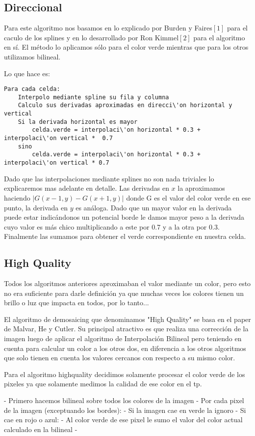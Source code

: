 \subsection{Direccional}

Para este algoritmo nos basamos en lo explicado por Burden y Faires$[1]$ para el caculo de los splines y en lo desarrollado por Ron Kimmel$[2]$ para el algoritmo en sí. El método lo aplicamos sólo para el color verde mientras que para los otros utilizamos bilineal. 

Lo que hace es:
\begin{lstlisting}[frame=single] 
Para cada celda:
	Interpolo mediante spline su fila y columna
	Calculo sus derivadas aproximadas en direcci\'on horizontal y vertical
	Si la derivada horizontal es mayor
		celda.verde = interpolaci\'on horizontal * 0.3 +  interpolaci\'on vertical *  0.7
	sino
		celda.verde = interpolaci\'on horizontal * 0.3 +  interpolaci\'on vertical * 0.7	
\end{lstlisting}

Dado que las interpolaciones mediante splines no son nada triviales lo explicaremos mas adelante en detalle. Las derivadas en $x$  la aproximamos haciendo $|G(x-1,y)-G(x+1,y)|$ donde G es el valor del color verde en ese punto, la derivada en $y$ es análoga. Dado que un mayor valor en la derivada puede estar indicándonos un potencial borde le damos mayor peso a la derivada cuyo valor es más chico multiplicando a este por 0.7 y a la otra por 0.3. Finalmente las sumamos para obtener el verde correspondiente en nuestra celda.

\subsection{High Quality}

Todos los algoritmos anteriores aproximaban el valor mediante un color, pero esto no era suficiente para darle definición ya que muchas veces los colores tienen un brillo o luz que impacta en todos, por lo tanto... 

El algoritmo de demosaicing que denominamos "High Quality" se basa en el paper de Malvar, He y Cutler. Su principal atractivo es que realiza una corrección de la imagen luego de aplicar el algoritmo de Interpolación Bilineal pero teniendo en cuenta para calcular un color a los otros dos, en diferencia a los otros algoritmos que solo tienen en cuenta los valores cercanos con respecto a su mismo color.



Para el algoritmo highquality decidimos solamente procesar el color verde de los pixeles ya que solamente medimos la calidad de ese color en el tp.

- Primero hacemos bilineal sobre todos los colores de la imagen
- Por cada pixel de la imagen (exceptuando los bordes):
	- Si la imagen cae en verde la ignoro
	- Si cae en rojo o azul:
		- Al color verde de ese pixel le sumo el valor del color actual calculado en la bilineal
		- 
		
	



